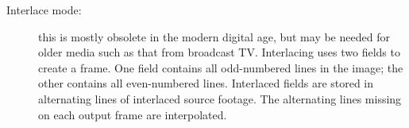 \begin{description}
    \item[Interlace mode:]
        this is mostly obsolete in the modern digital age, but may be needed for older media such as that from broadcast TV.  Interlacing uses two fields to create a frame. One field contains all odd-numbered lines in the image; the other contains all even-numbered lines.  Interlaced fields are stored in alternating lines of interlaced source footage. The alternating lines missing on each output frame are interpolated.
\end{description}




